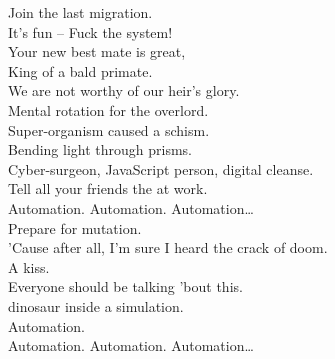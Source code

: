 
\label{album:kg}









Join the last migration. \\
It's fun -- Fuck the system! \\
Your new best mate is great, \\
King of a bald primate. \\
We are not worthy of our heir's glory. \\
Mental rotation for the overlord. \\

Super-organism caused a schism. \\
Bending light through prisms. \\
Cyber-surgeon, JavaScript person, digital cleanse. \\
Tell all your friends the  at work. \\

Automation. Automation. Automation… \\

Prepare for mutation. \\
'Cause after all, I'm sure I heard the crack of doom. \\
A  kiss. \\
Everyone should be talking 'bout this. \\
  dinosaur inside a simulation. \\
Automation. \\

Automation. Automation. Automation… \\




